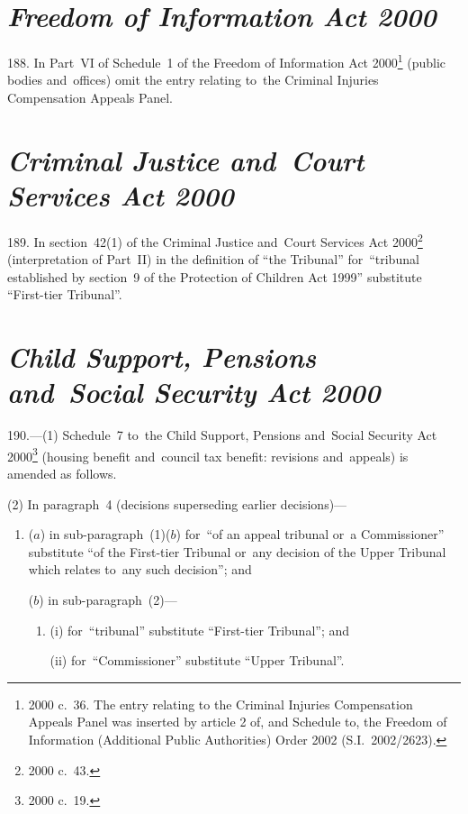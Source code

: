 \documentclass[12pt,a4paper]{article}
\begin{document}
\section*{\itshape Freedom of Information Act 2000}

188.  In Part~VI of Schedule~1 of the Freedom of Information Act 2000\footnote{2000 c.~36. The entry relating to the Criminal Injuries Compensation Appeals Panel was inserted by article 2 of, and Schedule to, the Freedom of Information (Additional Public Authorities) Order 2002 (S.I.~2002/2623).} (public bodies and~offices) omit the entry relating to~the Criminal Injuries Compensation Appeals Panel.

\section*{\itshape\sloppy{} Criminal Justice and~Court Services Act 2000}

189.  In section~42(1) of the Criminal Justice and~Court Services Act 2000\footnote{2000 c.~43.} (interpretation of Part~II) in the definition of “the Tribunal” for~“tribunal established by section~9 of the Protection of Children Act 1999” substitute “First-tier Tribunal”.

\section*{\itshape Child Support, Pensions and~Social Security Act 2000}

190.---(1)  Schedule~7 to~the Child Support, Pensions and~Social Security Act 2000\footnote{2000 c.~19.} (housing benefit and~council tax benefit: revisions and~appeals) is amended as follows.

(2) In paragraph~4 (decisions superseding earlier decisions)—
\begin{enumerate}\item[]
($a$) in sub-paragraph~(1)($b$)  for~“of an appeal tribunal or~a Commissioner” substitute “of the First-tier Tribunal or~any decision of the Upper Tribunal which relates to~any such decision”; and

($b$) in sub-paragraph~(2)—
\begin{enumerate}\item[]
(i) for~“tribunal” substitute “First-tier Tribunal”; and

(ii) for~“Commissioner” substitute “Upper Tribunal”.
\end{enumerate}
\end{enumerate}
\end{document}
